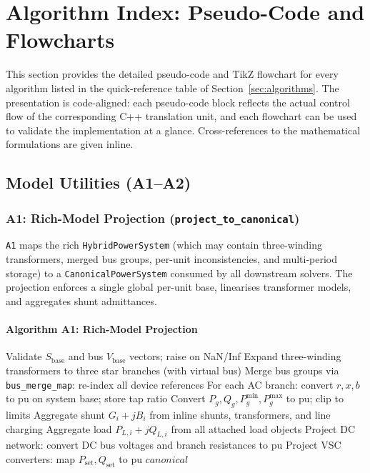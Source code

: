 \section{Algorithm Index: Pseudo-Code and Flowcharts}
\label{sec:algo-full}

This section provides the detailed pseudo-code and TikZ flowchart for every
algorithm listed in the quick-reference table of
Section~\ref{sec:algorithms}.  The presentation is code-aligned: each
pseudo-code block reflects the actual control flow of the corresponding C++
translation unit, and each flowchart can be used to validate the
implementation at a glance.  Cross-references to the mathematical
formulations are given inline.

\subsection{Model Utilities (A1--A2)}
\label{sec:algo-model-utils}

\subsubsection{A1: Rich-Model Projection (\texttt{project\_to\_canonical})}
\label{algo:a1}

\texttt{A1} maps the rich \texttt{HybridPowerSystem} (which may contain
three-winding transformers, merged bus groups, per-unit inconsistencies, and
multi-period storage) to a \texttt{CanonicalPowerSystem} consumed by all
downstream solvers.  The projection enforces a single global per-unit base,
linearises transformer models, and aggregates shunt admittances.

\paragraph{Algorithm A1: Rich-Model Projection}
\begin{algorithmic}[1]
  \State Validate $S_\mathrm{base}$ and bus $V_\mathrm{base}$ vectors; raise on NaN/Inf
  \State Expand three-winding transformers to three star branches (with virtual bus)
  \State Merge bus groups via \texttt{bus\_merge\_map}: re-index all device references
  \State For each AC branch: convert $r,x,b$ to pu on system base; store tap ratio
    \State Convert $P_g, Q_g, P_g^{\min}, P_g^{\max}$ to pu; clip to limits
  \EndFor
    \State Aggregate shunt $G_i + jB_i$ from inline shunts, transformers, and line charging
    \State Aggregate load $P_{L,i} + jQ_{L,i}$ from all attached load objects
  \EndFor
  \State Project DC network: convert DC bus voltages and branch resistances to pu
  \State Project VSC converters: map $P_\mathrm{set}, Q_\mathrm{set}$ to pu
  \State \Return $\mathit{canonical}$
\EndProcedure
\end{algorithmic}

